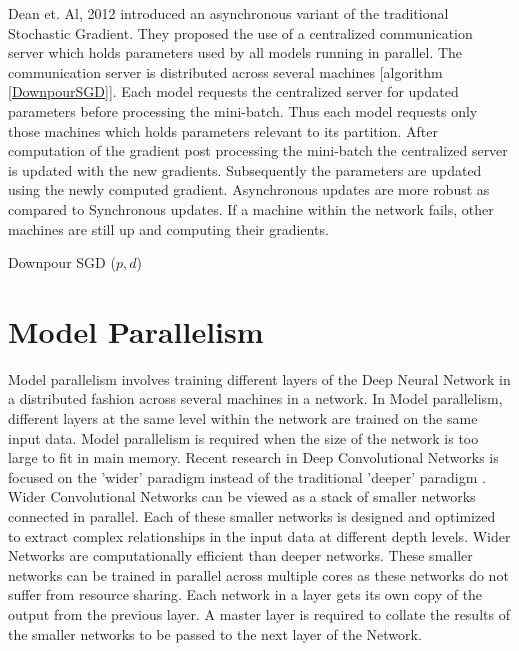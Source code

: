 \documentclass[sigconf]{acmart}
\begin{document}
Dean et. Al, 2012 \cite{Dean} introduced an asynchronous variant of the traditional Stochastic Gradient. They proposed the use of a centralized communication server which holds parameters used by all models running in parallel. The communication server is distributed across several machines [algorithm \ref{DownpourSGD}]. Each model requests the centralized server for updated parameters before processing the mini-batch. Thus each model requests only those machines which holds parameters relevant to its partition. After computation of the gradient post processing the mini-batch the centralized server is updated with the new gradients. Subsequently the parameters are updated using the newly computed gradient. Asynchronous updates are more robust as compared to Synchronous updates. If a machine within the network fails, other machines are still up and computing their gradients.  

\begin{algorithm}[htbp]

\caption{Downpour SGD ($p,d$)}\label{DownpourSGD}

\begin{algorithmic}[1]

\EndFor
\end{algorithmic}

\end{algorithm}



\section{Model Parallelism} \label{layer}

Model parallelism involves training different layers of the Deep Neural Network in a distributed fashion across several machines in a network. In Model parallelism, different layers at the same level within the network are trained on the same input data. Model parallelism is required when the size of the network is too large to fit in main memory. Recent research in Deep Convolutional Networks is focused on the 'wider' paradigm instead of the traditional 'deeper' paradigm \cite{Googlenet}. Wider Convolutional Networks can be viewed as a stack of smaller networks connected in parallel. Each of these smaller networks is designed and optimized to extract complex relationships in the input data at different depth levels. Wider Networks are computationally efficient than deeper networks. These smaller networks can be trained in parallel across multiple cores as these networks do not suffer from resource sharing. Each network in a layer gets its own copy of the output from the previous layer. A master layer is required to collate the results of the smaller networks to be passed to the next layer of the Network.
\end{document}
